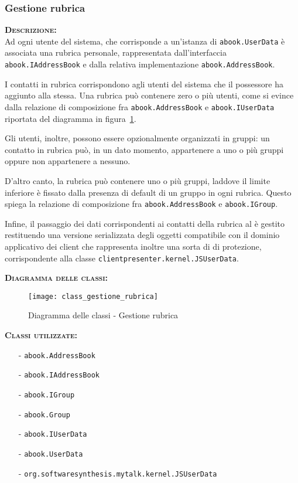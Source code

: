 \subsubsection{Gestione rubrica}
\begin{description}
	\item{\scshape\bfseries Descrizione:}\\
Ad ogni utente del sistema, che corrisponde a un'istanza di \texttt{abook.UserData} è associata una rubrica personale, rappresentata dall'interfaccia \texttt{abook.IAddressBook} e dalla relativa implementazione \texttt{abook.AddressBook}.

I contatti in rubrica corrispondono agli utenti del sistema che il possessore ha aggiunto alla stessa. Una rubrica può contenere zero o più utenti, come si evince dalla relazione di composizione fra \texttt{abook.AddressBook} e \texttt{abook.IUserData} riportata del diagramma in figura~\ref{fig:gestionerubrica}.

Gli utenti, inoltre, possono essere opzionalmente organizzati in gruppi: un contatto in rubrica può, in un dato momento, appartenere a uno o più gruppi oppure non appartenere a nessuno.

D'altro canto, la rubrica può contenere uno o più gruppi, laddove il limite inferiore è fissato dalla presenza di default di un gruppo  in ogni rubrica. Questo spiega la relazione di composizione fra \texttt{abook.AddressBook} e \texttt{abook.IGroup}.

Infine, il passaggio dei dati corrispondenti ai contatti della rubrica al  è gestito restituendo una versione serializzata degli oggetti compatibile con il dominio applicativo dei client che rappresenta inoltre una sorta di  di protezione, corrispondente alla classe \texttt{clientpresenter.kernel.JSUserData}.

	\item{\scshape\bfseries Diagramma delle classi:}
\begin{figure}[H]
  \centering
  \texttt{[image: class\_gestione\_rubrica]}
  \caption{Diagramma delle classi - Gestione rubrica}\label{fig:gestionerubrica}
\end{figure}
	
	\item{\scshape\bfseries Classi utilizzate:}\\
	\begin{itemize}[nolistsep, noitemsep]
	  \item[-] \texttt{abook.AddressBook}
	  \item[-] \texttt{abook.IAddressBook}
	  \item[-] \texttt{abook.IGroup}
	  \item[-] \texttt{abook.Group}
	  \item[-] \texttt{abook.IUserData}
	  \item[-] \texttt{abook.UserData}
	  \item[-] \texttt{org.softwaresynthesis.mytalk.kernel.JSUserData}
	\end{itemize}
\end{description}

